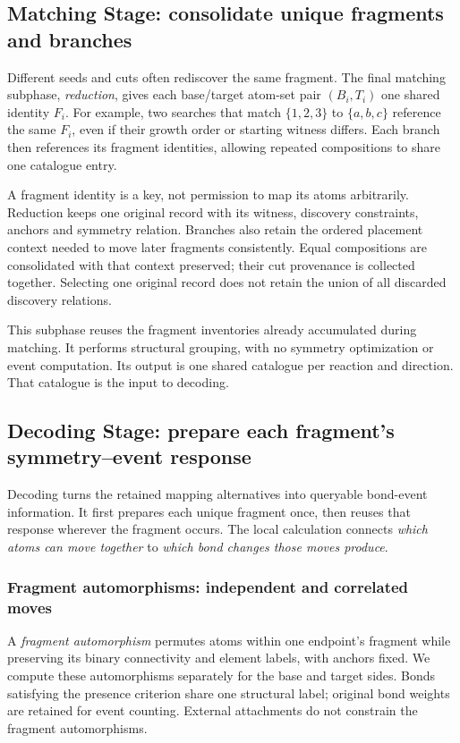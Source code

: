 \subsection{Matching Stage: consolidate unique fragments and branches}
\label{sec:reduction}

Different seeds and cuts often rediscover the same fragment. The final matching subphase, \emph{reduction}, gives each base/target atom-set pair $(B_i,T_i)$ one shared identity $F_i$. For example, two searches that match $\{1,2,3\}$ to $\{a,b,c\}$ reference the same $F_i$, even if their growth order or starting witness differs. Each branch then references its fragment identities, allowing repeated compositions to share one catalogue entry.

A fragment identity is a key, not permission to map its atoms arbitrarily. Reduction keeps one original record with its witness, discovery constraints, anchors and symmetry relation. Branches also retain the ordered placement context needed to move later fragments consistently. Equal compositions are consolidated with that context preserved; their cut provenance is collected together. Selecting one original record does not retain the union of all discarded discovery relations.

This subphase reuses the fragment inventories already accumulated during matching. It performs structural grouping, with no symmetry optimization or event computation. Its output is one shared catalogue per reaction and direction. That catalogue is the input to decoding.

\subsection{Decoding Stage: prepare each fragment's symmetry--event response}
\label{sec:decoding}

Decoding turns the retained mapping alternatives into queryable bond-event information. It first prepares each unique fragment once, then reuses that response wherever the fragment occurs. The local calculation connects \emph{which atoms can move together} to \emph{which bond changes those moves produce}.

\subsubsection{Fragment automorphisms: independent and correlated moves}

A \emph{fragment automorphism} permutes atoms within one endpoint's fragment while preserving its binary connectivity and element labels, with anchors fixed. We compute these automorphisms separately for the base and target sides. Bonds satisfying the presence criterion share one structural label; original bond weights are retained for event counting. External attachments do not constrain the fragment automorphisms.

